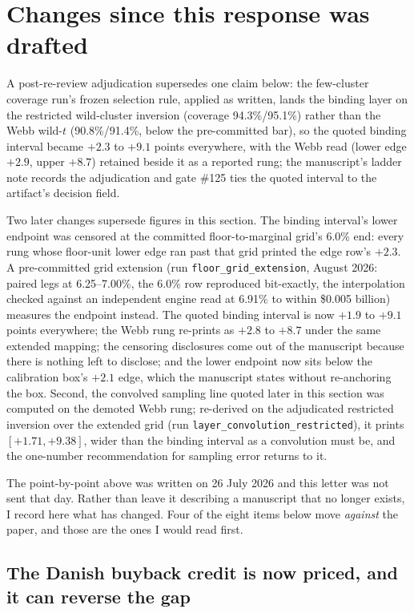 \documentclass[11pt]{article}
\begin{document}
\section{Changes since this response was drafted}

A post-re-review adjudication supersedes one claim below: the few-cluster coverage run's frozen selection rule, applied as written, lands the binding layer on the restricted wild-cluster inversion (coverage 94.3\%/95.1\%) rather than the Webb wild-$t$ (90.8\%/91.4\%, below the pre-committed bar), so the quoted binding interval became $+2.3$ to $+9.1$ points everywhere, with the Webb read (lower edge $+2.9$, upper $+8.7$) retained beside it as a reported rung; the manuscript's ladder note records the adjudication and gate \#125 ties the quoted interval to the artifact's decision field.

Two later changes supersede figures in this section. The binding interval's lower endpoint was censored at the committed floor-to-marginal grid's 6.0\% end: every rung whose floor-unit lower edge ran past that grid printed the edge row's $+2.3$. A pre-committed grid extension (run \texttt{floor\_grid\_extension}, August 2026: paired legs at 6.25--7.00\%, the 6.0\% row reproduced bit-exactly, the interpolation checked against an independent engine read at 6.91\% to within \$0.005 billion) measures the endpoint instead. The quoted binding interval is now $+1.9$ to $+9.1$ points everywhere; the Webb rung re-prints as $+2.8$ to $+8.7$ under the same extended mapping; the censoring disclosures come out of the manuscript because there is nothing left to disclose; and the lower endpoint now sits below the calibration box's $+2.1$ edge, which the manuscript states without re-anchoring the box. Second, the convolved sampling line quoted later in this section was computed on the demoted Webb rung; re-derived on the adjudicated restricted inversion over the extended grid (run \texttt{layer\_convolution\_restricted}), it prints $[+1.71, +9.38]$, wider than the binding interval as a convolution must be, and the one-number recommendation for sampling error returns to it.


The point-by-point above was written on 26 July 2026 and this letter was not sent
that day. Rather than leave it describing a manuscript that no longer exists, I
record here what has changed. Four of the eight items below move \emph{against} the
paper, and those are the ones I would read first.

\subsection{The Danish buyback credit is now priced, and it can reverse the gap}
\end{document}
